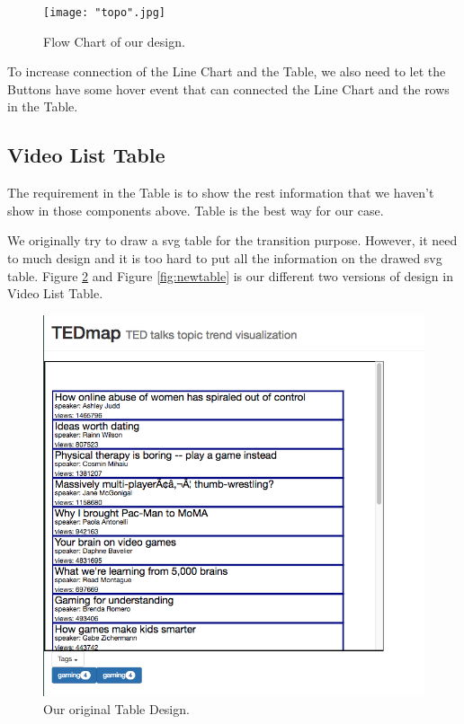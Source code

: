 \documentclass{report}
\numberwithin{figure}{section}
\begin{document}
\begin{figure}
\begin{center}
\texttt{[image: "topo".jpg]}
\caption{Flow Chart of our design.}
\label{fig:topo}
\end{center}
\end{figure}


\quad To increase connection of the Line Chart and the Table, we also need to let the Buttons have some hover event that can connected the Line Chart and the rows in the Table.

\subsection{Video List Table}

\quad The requirement in the Table is to show the rest information that we haven't  show  in those components above. Table is the best way for our case. 

We originally try to draw a svg table for the transition purpose. However, it need to much design and it is too hard to put all the information on the drawed svg table. Figure \ref{fig:oldtable} and Figure \ref{fig:newtable} is our different two versions of design in Video List Table.



\begin{figure}
\begin{center}
\includegraphics[scale=0.2]{table}
\caption{Our original Table Design.}
\label{fig:oldtable}
\end{center}
\end{figure} 
\end{document}
